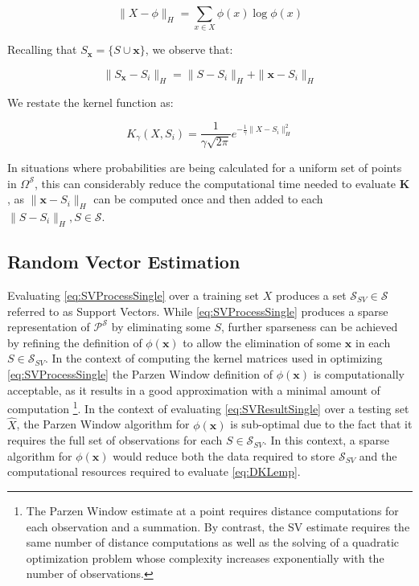 \documentclass[10pt]{article}
\begin{document}
\begin{equation}
\| X - \phi \|_{H} = \sum_{x \in X} \phi(x) \log \phi(x)
\end{equation}

Recalling that \( S_\mathbf{x} = \{ S \cup \mathbf{x} \} \), we observe that:

\begin{equation}
\| S_{\mathbf{x}} - S_i \|_{H} = \| S - S_i \|_{H} + \| \mathbf{x} - S_i \|_{H}
\end{equation}

We restate the kernel function as:

\begin{equation}
K_\gamma( X, S_i ) =  \frac{1}{\gamma \sqrt{2\pi} } e^{-\frac{1}{\gamma} \|X - S_i \|_{H}^2}
\end{equation}

In situations where probabilities are being calculated for a uniform set of points in \( \Omega^{\mathcal{S}} \), this can considerably reduce the computational time needed to evaluate \( \mathbf{K} \), as \( \|\mathbf{x} - S_i \|_H \) can be computed once and then added to each \( \|S - S_i\|_H, S \in \mathcal{S} \).


\subsection{ Random Vector Estimation }
 
Evaluating \ref{eq:SVProcessSingle} over a training set \( X \) produces a set \( \mathcal{S}_{SV} \in \mathcal{S} \) referred to as Support Vectors.  While \ref{eq:SVProcessSingle} produces a sparse representation of \( \mathcal{P}^\mathcal{S} \) by eliminating some \( S \), further sparseness can be achieved by refining the definition of \( \phi(\mathbf{x}) \) to allow the elimination of some \( \mathbf{x} \) in each \( S \in \mathcal{S}_{SV} \).  In the context of computing the kernel matrices used in optimizing \ref{eq:SVProcessSingle} the Parzen Window definition of \( \phi(\mathbf{x}) \) is computationally acceptable, as it results in a good approximation with a minimal amount of computation \footnote{ The Parzen Window estimate at a point requires distance computations for each observation and a summation.  By contrast, the SV estimate requires the same number of distance computations as well as the solving of a quadratic optimization problem whose complexity increases exponentially with the number of observations. }.  In the context of evaluating \ref{eq:SVResultSingle} over a testing set \( \hat{X} \), the Parzen Window algorithm for \( \phi(\mathbf{x}) \) is sub-optimal due to the fact that it requires the full set of observations for each \( S \in \mathcal{S}_{SV} \).  In this context, a sparse algorithm for \( \phi(\mathbf{x}) \) would reduce both the data required to store \( \mathcal{S}_{SV} \) and the computational resources required to evaluate \ref{eq:DKLemp}.
\end{document}
